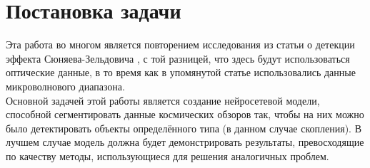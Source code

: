 \chapter{Постановка задачи}
\label{cha:ch_1}
Эта работа во многом является повторением исследования из статьи о детекции эффекта 
Сюняева-Зельдовича \cite{Bonjean}, с той разницей, что здесь будут использоваться оптические данные, в то время 
как в упомянутой статье использовались данные микроволнового диапазона.\\

Основной задачей этой работы является создание нейросетевой модели, способной сегментировать  
данные космических обзоров так, чтобы на них можно было детектировать объекты определённого типа 
(в данном случае скопления). В лучшем случае модель должна будет демонстрировать результаты, 
превосходящие по качеству методы, использующиеся для решения аналогичных проблем.
